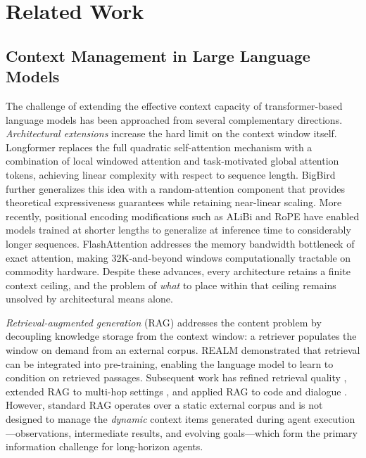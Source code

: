 \documentclass[review,12pt]{elsarticle}
\begin{document}
\section{Related Work}
\label{sec:related}

\subsection{Context Management in Large Language Models}
\label{subsec:context-management}

The challenge of extending the effective context capacity of transformer-based
language models has been approached from several complementary directions.
\textit{Architectural extensions} increase the hard limit on the context window
itself.  Longformer \citep{beltagy2020longformer} replaces the full quadratic
self-attention mechanism with a combination of local windowed attention and
task-motivated global attention tokens, achieving linear complexity with respect
to sequence length.  BigBird \citep{zaheer2020bigbird} further generalizes this
idea with a random-attention component that provides theoretical expressiveness
guarantees while retaining near-linear scaling.  More recently, positional
encoding modifications such as ALiBi \citep{press2022alibi} and RoPE
\citep{su2024roformer} have enabled models trained at shorter lengths to
generalize at inference time to considerably longer sequences.  FlashAttention
\citep{dao2022flashattention,dao2023flashattention2} addresses the memory
bandwidth bottleneck of exact attention, making 32K-and-beyond windows
computationally tractable on commodity hardware.  Despite these advances, every
architecture retains a finite context ceiling, and the problem of \emph{what}
to place within that ceiling remains unsolved by architectural means alone.

\textit{Retrieval-augmented generation} (RAG) \citep{lewis2020rag} addresses
the content problem by decoupling knowledge storage from the context window:
a retriever populates the window on demand from an external corpus.  REALM
\citep{guu2020realm} demonstrated that retrieval can be integrated into
pre-training, enabling the language model to learn to condition on retrieved
passages.  Subsequent work has refined retrieval quality \citep{karpukhin2020dpr},
extended RAG to multi-hop settings \citep{trivedi2022interleaving}, and
applied RAG to code \citep{parvez2021retrieval} and dialogue
\citep{shuster2021retrieval}.  However, standard RAG operates over a static
external corpus and is not designed to manage the \emph{dynamic} context items
generated during agent execution—observations, intermediate results, and
evolving goals—which form the primary information challenge for long-horizon
agents.
\end{document}
